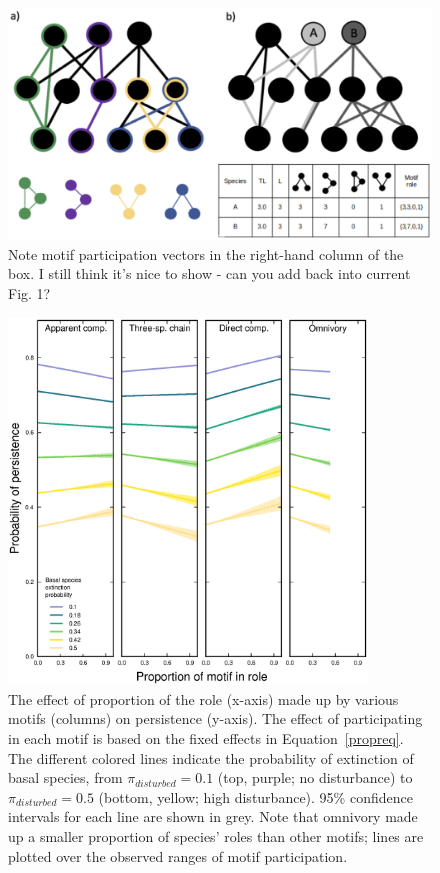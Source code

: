 \documentclass[12pt]{article}
\begin{document}
\begin{spacing}{2.0}
        \begin{figure}[hb!]
        \centering
        \includegraphics[width=.9\textwidth]{figures/concept_fig_ver2_edit.eps}
        \caption{Note motif participation vectors in the right-hand column of the box. I still think it's nice to show - can you add back into current Fig. 1?}
    \label{fig:concept_wrongcolour}
    \end{figure}

    
        \begin{figure}[hb!]
        \centering
        \includegraphics[width=0.85\textwidth]{figures/persistence_motif_participation.eps}
        \caption{The effect of proportion of the role (x-axis) made up by various motifs (columns) on persistence (y-axis). The effect of participating in each motif is based on the fixed effects in Equation~\ref{propreq}. The different colored lines indicate the probability of extinction of basal species, from $\pi_{disturbed} = 0.1$ (top, purple; no disturbance) to $\pi_{disturbed} = 0.5$ (bottom, yellow; high disturbance). 95\% confidence intervals for each line are shown in grey. Note that omnivory made up a smaller proportion of species' roles than other motifs; lines are plotted over the observed ranges of motif participation.}
    \label{fig:prop_lmer_all}
    \end{figure}
        

\end{spacing}
\end{document}

